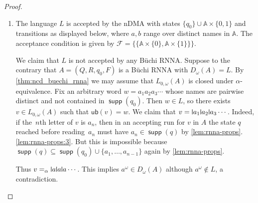 \documentclass[10pt,a4paper]{amsart}
\newcommand{\midmid}{\hspace{0.2ex}{\rule[-0.1ex]{0.6pt}{1.65ex}}\hspace{0.2ex}}
\newcommand{\newletter}[1]{{\midmid}#1}
\newcommand{\F}{\mathcal{F}}
\newcommand{\ub}{\mathsf{ub}}
\numberwithin{equation}{section}
\newcommand{\seq}{\subseteq}
\newcommand{\+}[1]{\mathcal{#1}\xspace}
\newcommand{\names}{\mathbb{A}}
\DeclareMathOperator{\supp}{\mathsf{supp}} %
\theoremstyle{definition}
\begin{document}
\begin{proof}
\begin{enumerate}
  \item The language $L$ is accepted by the nDMA with states
    $\{q_0\} \cup \names\times \{0,1\}$ and transitions as displayed
    below, where $a,b$ range over distinct names in $\names$. The
    acceptance condition is given by
    $\F=\{\{\names\times \{0\}, \names\times \{1\}\}\}$.
    \begin{center}
    \end{center}
    We claim that $L$ is not accepted by any Büchi RNNA. Suppose to
    the contrary that $A=(Q,R,q_0,F)$ is a Büchi RNNA with
    $D_\omega(A)=L$. By \autoref{thm:ncd_buechi_rnna} we may assume
    that $L_{0,\omega}(A)$ is closed under $\alpha$-equivalence.
    Fix an arbitrary word $w=a_1a_2a_3\cdots$ whose names are pairwise
    distinct and not contained in $\supp(q_0)$. Then $w\in L$, so
    there exists $v\in L_{0,\omega}(A)$ such that $\ub(v)=w$. We claim
    that $v=\newletter a_1\newletter a_2\newletter a_3\cdots$. Indeed,
    if the~$n$th letter of $v$ is $a_n$, then in an accepting run for
    $v$ in $A$ the state $q$ reached before reading~$a_n$ must have
    $a_n\in \supp(q)$ by
    \autoref{lem:rnna-props}.\ref{lem:rnna-props:3}. But this is
    impossible because
    $\supp(q)\seq \supp(q_0)\cup \{a_1,\ldots, a_{n-1}\}$ again by
    \autoref{lem:rnna-props}.

    Thus $v=_\alpha \newletter a\newletter a\newletter a\cdots$. This
    implies $a^\omega\in D_\omega(A)$ although $a^\omega\not\in L$, a
    contradiction.\qedhere
  \end{enumerate}
\end{proof}
\end{document}
